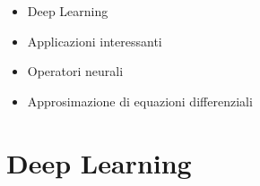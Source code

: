 \documentclass[aspectratio=169]{beamer}
\begin{document}

\begin{frame}
\begin{itemize}
	\setlength\itemsep{1.5em}
	\item Deep Learning
	\item Applicazioni interessanti
	\item Operatori neurali
	\item Approsimazione di equazioni differenziali
\end{itemize}
\end{frame}

\section{Deep Learning}
\sectionpage
\end{document}

